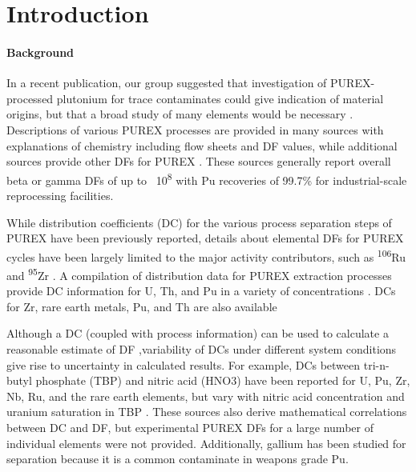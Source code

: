 \documentclass[review]{elsarticle}
\newcommand{\tss}{\textsuperscript}
\begin{document}
\linenumbers

\section{Introduction}

\paragraph{Background} In a recent publication, our group suggested that investigation
 of PUREX-processed plutonium for trace contaminates could give indication of material 
 origins, but that a broad study of many elements would be necessary \cite{chirayath2015}.
 Descriptions of various PUREX processes are provided in many sources \cite{reas1957,stoller1961,benedict1982}
 with explanations of chemistry including flow sheets and DF values, while additional sources provide 
 other DFs  for PUREX \cite{gresky1950,arker1954,chandler1954}.
 These sources generally report overall beta or gamma DFs of up to ~10\tss{8} with Pu recoveries
 of 99.7\% for industrial-scale reprocessing facilities.

 While distribution coefficients (DC) for 
 the various process separation steps of PUREX have been previously reported, details about 
 elemental DFs for PUREX cycles have been largely limited to the major activity contributors,
 such as \tss{106}Ru and \tss{95}Zr \cite{stoller1961}. 
 A compilation of distribution data for PUREX extraction processes provide DC
 information for U, Th, and Pu in a variety of concentrations \cite{prout1957}.
 DCs for Zr, rare earth metals, Pu, and Th are also available \cite{alcockbed1957,
 best1957,hesford1957,scargil1957,alcock1958,best1959,hesford1959}
 
 Although a DC (coupled with process information) can be used to calculate a reasonable estimate of DF 
 \cite{colburn1939,sherwood1952,long1967,perry2008},variability of DCs under different
 system conditions give rise to uncertainty in calculated results.
 For example, DCs between tri-n-butyl phosphate (TBP) and nitric acid (HNO3) have 
 been reported for U, Pu, Zr, Nb, Ru, and the rare earth elements, but vary with 
 nitric acid concentration and uranium saturation in TBP \cite{sherwood1952,stoller1961}.
 These sources also derive mathematical correlations between DC and DF, but experimental 
 PUREX DFs for a large number of individual elements were not provided. 
 Additionally, gallium has been 
 studied for separation \cite{collins2000} because it is a common contaminate in weapons
 grade Pu. 
 
\end{document}
